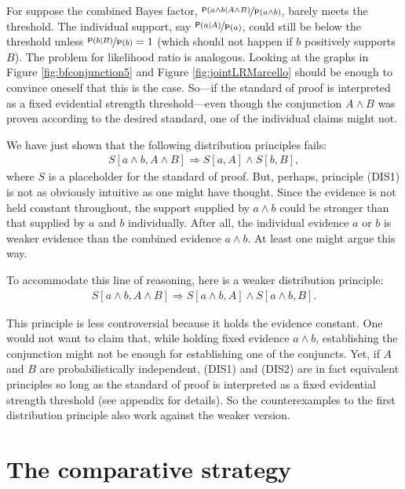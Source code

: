\documentclass[
  10pt,
  dvipsnames,enabledeprecatedfontcommands]{scrartcl}
\newcommand{\raf}[1]{\todo[color=olive!40]{#1}}
\newcommand{\et}{\wedge}
\newcommand{\pr}[1]{\ensuremath{\mathsf{P}(#1)}}
\begin{document}
For suppose the combined Bayes factor,
\(\nicefrac{\pr{a \et b \vert A \et B}}{\pr{a \et b}}\), barely meets
the threshold. The individual support, say
\(\nicefrac{\pr{a \vert A}}{\pr{a}}\), could still be below the
threshold unless \(\nicefrac{\pr{b \vert B}}{\pr{b}}=1\) (which should
not happen if \(b\) positively supports \(B\)). The problem for
likelihood ratio is analogous. Looking at the graphs in Figure
\ref{fig:bfconjunction5} and Figure \ref{fig:jointLRMarcello} should be
enough to convince oneself that this is the case. So---if the standard
of proof is interpreted as a fixed evidential strength threshold---even
though the conjunction \(A \et B\) was proven according to the desired
standard, one of the individual claims might not.

We have just shown that the following distribution principles fails:
\begin{align}
S[a \wedge b, A\wedge B] \Rightarrow S[a, A] \wedge S[b, B], \tag{DIS1}
\end{align} where \(S\) is a placeholder for the standard of proof. But,
perhaps, principle (DIS1) is not as obviously intuitive as one might
have thought. Since the evidence is not held constant throughout, the
support supplied by \(a\wedge b\) could be stronger than that supplied
by \(a\) and \(b\) individually. After all, the individual evidence
\(a\) or \(b\) is weaker evidence than the combined evidence
\(a\wedge b\). At least one might argue this way.

To accommodate this line of reasoning, here is a weaker distribution
principle: \begin{align}
S[a \wedge b, A\wedge B] \Rightarrow S[a \wedge b, A] \wedge S[a\wedge b, B]. \tag{DIS2}
\end{align}

\noindent This principle is less controversial because it holds the
evidence constant. One would not want to claim that, while holding fixed
evidence \(a\wedge b\), establishing the conjunction might not be enough
for establishing one of the conjuncts. Yet, if \(A\) and \(B\) are
probabilistically independent, (DIS1) and (DIS2) are in fact equivalent
principles so long as the standard of proof is interpreted as a fixed
evidential strength threshold (see appendix for
details).\raf{M: Need proof of this. Is it in the appendix?} So the
counterexamples to the first distribution principle also work against
the weaker version.

\hypertarget{the-comparative-strategy}{%
\section{The comparative strategy}\label{the-comparative-strategy}}
\end{document}
